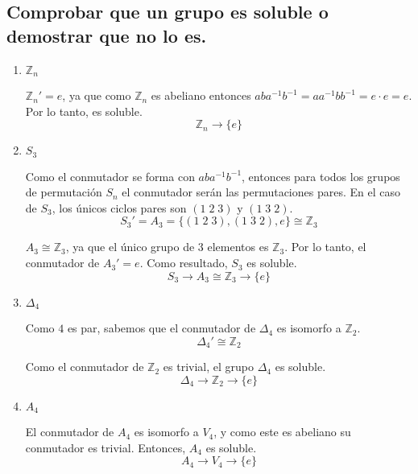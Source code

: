 \subsection{Comprobar que un grupo es soluble o demostrar que no lo es.}

\begin{enumerate}
    \item $\mathbb{Z}_n$

    $\mathbb{Z}_n' = e$, ya que como $\mathbb{Z}_n$ es abeliano entonces $aba^{-1}b^{-1}=aa^{-1}bb^{-1} = e\cdot e = e$. Por lo tanto, es soluble.
    \begin{equation}
        \mathbb{Z}_{n} \to \{e\}
    \end{equation}

    \item $S_3$

    Como el conmutador se forma con $aba^{-1}b^{-1}$, entonces para todos los grupos de permutación $S_n$ el conmutador serán las permutaciones pares. En el caso de $S_3$, los únicos ciclos pares son $(1\;2\;3)$ y $(1\;3\;2)$.
    \begin{equation}
        S_{3}' = A_{3} = \{(1\;2\;3), (1\;3\;2), e\} \cong \mathbb{Z}_{3}
    \end{equation}

    $A_{3} \cong \mathbb{Z}_{3}$, ya que el único grupo de 3 elementos es $\mathbb{Z}_{3}$. Por lo tanto, el conmutador de $A_{3}' = e$. Como resultado, $S_{3}$ es soluble.
    \begin{equation}
        S_{3} \to A_{3} \cong \mathbb{Z}_{3} \to \{e\}
    \end{equation}

    \item $\Delta_{4}$

    Como $4$ es par, sabemos que el conmutador de $\Delta_{4}$ es isomorfo a $\mathbb{Z}_{2}$.
    \begin{equation}
        \Delta_{4}' \cong \mathbb{Z}_{2}
    \end{equation}

    Como el conmutador de $\mathbb{Z}_{2}$ es trivial, el grupo $\Delta_{4}$ es soluble.
    \begin{equation}
        \Delta_{4} \to \mathbb{Z}_{2} \to \{e\}
    \end{equation}

    \item $A_{4}$

    El conmutador de $A_{4}$ es isomorfo a $V_{4}$, y como este es abeliano su conmutador es trivial. Entonces, $A_{4}$ es soluble.
    \begin{equation}
        A_{4} \to V_{4} \to \{e\}
    \end{equation}


\end{enumerate}
